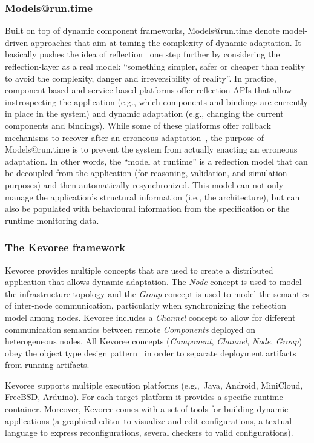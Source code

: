\subsubsection{Models@run.time}
Built on top of dynamic component frameworks, Models@run.time denote model-driven approaches that aim at taming the complexity of dynamic adaptation.
It basically pushes the idea of reflection~\cite{morin09a} one step further by considering the reflection-layer as a real model: ``something simpler, safer or cheaper than reality to avoid the complexity, danger and irreversibility of reality''.
In practice, component-based and service-based platforms offer reflection APIs that allow instrospecting the application (e.g., which components and bindings are currently in place in the system) and dynamic adaptation (e.g., changing the current components and bindings).
While some of these platforms offer rollback mechanisms to recover after an erroneous adaptation~\cite{leger2010reliable}, the purpose of Models@run.time is to prevent the system from actually enacting an erroneous adaptation. 
In other words, the ``model at runtime'' is a reflection model that can be decoupled from the application (for reasoning, validation, and simulation purposes) and then automatically resynchronized.
This model can not only manage the application's structural information (i.e., the architecture), but can also be populated with behavioural information from the specification or the runtime monitoring data.


\subsubsection*{The Kevoree framework\label{sec:kevoree}}	

Kevoree provides multiple concepts that are used to create a distributed application that allows dynamic adaptation. The \emph{Node} concept is used to model the infrastructure topology and the \emph{Group} concept is used to model the semantics of inter-node communication, particularly when synchronizing the reflection model among nodes. 
Kevoree includes a \emph{Channel} concept to allow for different communication semantics between remote \emph{Components} deployed on heterogeneous nodes. 
All Kevoree concepts (\textit{Component}, \textit{Channel}, \textit{Node}, \textit{Group}) obey the object type design pattern~\cite{johnson_type_1997} in order to separate deployment artifacts from running artifacts.  

Kevoree supports multiple execution platforms (e.g.,~Java, Android, MiniCloud, FreeBSD, Arduino). For each target platform it provides a specific runtime container. 
Moreover, Kevoree comes with a set of tools for building dynamic applications (a graphical editor to visualize and edit configurations, a textual language to express reconfigurations, several checkers to valid configurations). 

